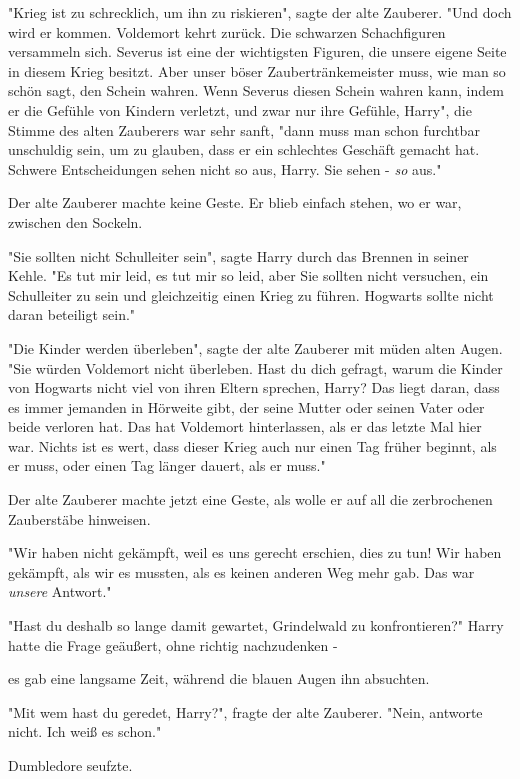 {"Krieg ist zu schrecklich, um ihn zu riskieren", sagte der alte Zauberer. "Und doch wird er kommen. Voldemort kehrt zurück. Die schwarzen Schachfiguren versammeln sich. Severus ist eine der wichtigsten Figuren, die unsere eigene Seite in diesem Krieg besitzt. Aber unser böser Zaubertränkemeister muss, wie man so schön sagt, den Schein wahren. Wenn Severus diesen Schein wahren kann, indem er die Gefühle von Kindern verletzt, und zwar nur ihre Gefühle, Harry", die Stimme des alten Zauberers war sehr sanft, "dann muss man schon furchtbar unschuldig sein, um zu glauben, dass er ein schlechtes Geschäft gemacht hat. Schwere Entscheidungen sehen nicht so aus, Harry. Sie sehen - \emph{so} aus."

Der alte Zauberer machte keine Geste. Er blieb einfach stehen, wo er war, zwischen den Sockeln.

"Sie sollten nicht Schulleiter sein", sagte Harry durch das Brennen in seiner Kehle. "Es tut mir leid, es tut mir so leid, aber Sie sollten nicht versuchen, ein Schulleiter zu sein und gleichzeitig einen Krieg zu führen. Hogwarts sollte nicht daran beteiligt sein."

"Die Kinder werden überleben", sagte der alte Zauberer mit müden alten Augen. "Sie würden Voldemort nicht überleben. Hast du dich gefragt, warum die Kinder von Hogwarts nicht viel von ihren Eltern sprechen, Harry? Das liegt daran, dass es immer jemanden in Hörweite gibt, der seine Mutter oder seinen Vater oder beide verloren hat. Das hat Voldemort hinterlassen, als er das letzte Mal hier war. Nichts ist es wert, dass dieser Krieg auch nur einen Tag früher beginnt, als er muss, oder einen Tag länger dauert, als er muss."

Der alte Zauberer machte jetzt eine Geste, als wolle er auf all die zerbrochenen Zauberstäbe hinweisen.

"Wir haben nicht gekämpft, weil es uns gerecht erschien, dies zu tun! Wir haben gekämpft, als wir es mussten, als es keinen anderen Weg mehr gab. Das war \emph{unsere} Antwort."

"Hast du deshalb so lange damit gewartet, Grindelwald zu konfrontieren?" Harry hatte die Frage geäußert, ohne richtig nachzudenken -

es gab eine langsame Zeit, während die blauen Augen ihn absuchten.

"Mit wem hast du geredet, Harry?", fragte der alte Zauberer. "Nein, antworte nicht. Ich weiß es schon."

Dumbledore seufzte.

}
